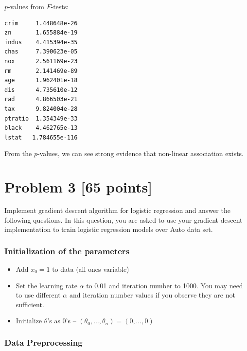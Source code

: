 \documentclass[a4paper,12pt]{article}
\begin{document}
$p$-values from $F$-tests:
\begin{verbatim}
crim     1.448648e-26
zn       1.655884e-19
indus    4.415394e-35
chas     7.390623e-05
nox      2.561169e-23
rm       2.141469e-89
age      1.962401e-18
dis      4.735610e-12
rad      4.866503e-21
tax      9.824004e-28
ptratio  1.354349e-33
black    4.462765e-13
lstat   1.784655e-116
\end{verbatim}

From the $p$-values, we can see strong evidence that non-linear association exists.













\newpage
\section*{Problem 3 [65 points]} 

Implement gradient descent algorithm for logistic regression and answer the following questions. In this question, you are asked to use your gradient descent implementation to train logistic regression models over Auto data set.
\subsubsection*{Initialization of the parameters} 

\begin{itemize}
\item Add $x_0 =1$ to data (all ones variable)
\item Set the learning rate $\alpha$ to 0.01 and iteration number to 1000. You may need to use different $\alpha$ and iteration number values if you observe they are not sufficient.
\item Initialize $\theta$'s as $0$'s -- $(\theta_0,\ldots, \theta_n) = (0,\ldots,0)$
\end{itemize}

\subsubsection*{Data Preprocessing} 
\end{document}
